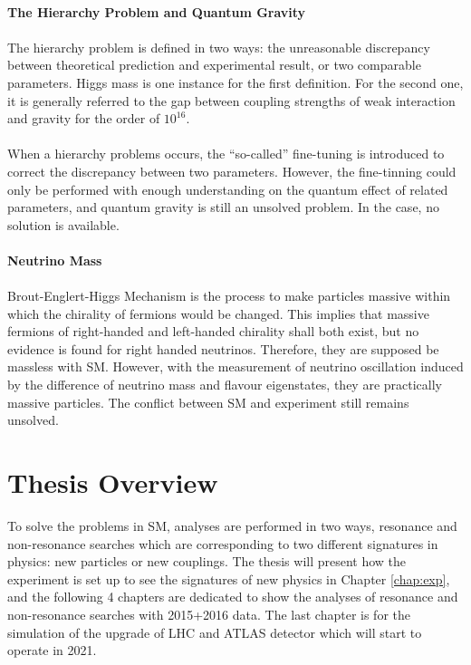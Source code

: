 \\{\bf The Hierarchy Problem and Quantum Gravity}
\\
\\The hierarchy problem is defined in two ways: the unreasonable discrepancy between theoretical prediction and experimental result, or two comparable parameters. Higgs mass is one instance for the first definition. For the second one, it is generally referred to the gap between coupling strengths of weak interaction and gravity for the order of $10^{16}$.
\\
\\When a hierarchy problems occurs, the ``so-called'' fine-tuning is introduced to correct the discrepancy between two parameters. However, the fine-tinning could only be performed with enough understanding on the quantum effect of related parameters, and quantum gravity is still an unsolved problem. In the case, no solution is available.
\\
\\{\bf Neutrino Mass}
\\
\\Brout-Englert-Higgs Mechanism is the process to make particles massive within which the chirality of fermions would be changed. This implies that massive fermions of right-handed and left-handed chirality shall both exist, but no evidence is found for right handed neutrinos. Therefore, they are supposed be massless with SM. However, with the measurement of neutrino oscillation induced by the difference of neutrino mass and flavour eigenstates, they are practically massive particles. The conflict between SM and experiment still remains unsolved.
\section{Thesis Overview}
To solve the problems in SM, analyses are performed in two ways, resonance and non-resonance searches which are corresponding to two different signatures in physics: new particles or new couplings. The thesis will present how the experiment is set up to see the signatures of new physics in Chapter \ref{chap:exp}, and the following 4 chapters are dedicated to show the analyses of resonance and non-resonance searches with 2015+2016 data. The last chapter is for the simulation of the upgrade of LHC and ATLAS detector which will start to operate in 2021.

